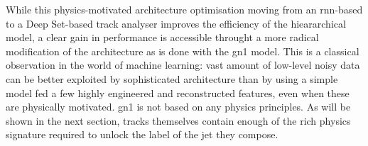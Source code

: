 While this physics-motivated architecture optimisation moving from an \gls{rnn}-based to a Deep Set-based track analyser improves the efficiency of the hieararchical model, a clear gain in performance is accessible throught a more radical modification of the architecture as is done with the \gls{gn1} model. This is a classical observation in the world of machine learning: vast amount of low-level noisy data can be better exploited by sophisticated architecture than by using a simple model fed a few highly engineered and reconstructed features, even when these are physically motivated. \gls{gn1} is not based on any physics principles. As will be shown in the next section, tracks themselves contain enough of the rich physics signature required to unlock the label of the jet they compose. 
